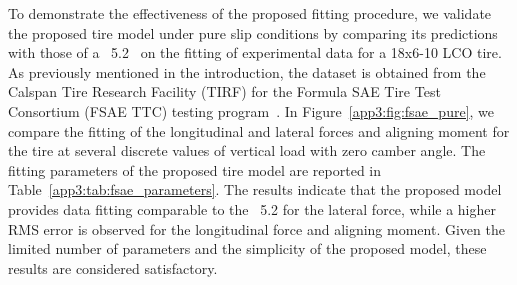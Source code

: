 
To demonstrate the effectiveness of the proposed fitting procedure, we validate the proposed tire model under pure slip conditions by comparing its predictions with those of a \MagicFormulae{}~5.2~\cite{pacejka2012tire} on the fitting of experimental data for a \Hoosier{} 18x6-10 LCO tire. As previously mentioned in the introduction, the dataset is obtained from the Calspan Tire Research Facility (TIRF) for the Formula SAE Tire Test Consortium (FSAE TTC) testing program~\cite{kasprzak2006formula}. In Figure~\ref{app3:fig:fsae_pure}, we compare the fitting of the longitudinal and lateral forces and aligning moment for the \Hoosier{} tire at several discrete values of vertical load with zero camber angle. The fitting parameters of the proposed tire model are reported in Table~\ref{app3:tab:fsae_parameters}. The results indicate that the proposed model provides data fitting comparable to the \MagicFormulae{}~5.2 for the lateral force, while a higher \ac{RMS} error is observed for the longitudinal force and aligning moment. Given the limited number of parameters and the simplicity of the proposed model, these results are considered satisfactory.

%  

